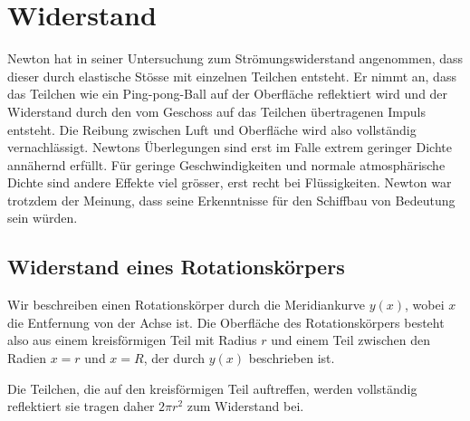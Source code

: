 %
%
%
%
\section{Widerstand\label{widerstand:section:teil0}}
Newton hat in seiner Untersuchung zum Strömungswiderstand angenommen,
dass dieser durch elastische Stösse mit einzelnen Teilchen entsteht.
Er nimmt an, dass das Teilchen wie ein Ping-pong-Ball auf der Oberfläche
reflektiert wird und der Widerstand durch den vom Geschoss auf das
Teilchen übertragenen Impuls entsteht.
Die Reibung zwischen Luft und Oberfläche wird also vollständig
vernachlässigt.
Newtons Überlegungen sind erst im Falle extrem geringer Dichte annähernd
erfüllt.
Für geringe Geschwindigkeiten und normale atmosphärische Dichte sind
andere Effekte viel grösser, erst recht bei Flüssigkeiten.
Newton war trotzdem der Meinung, dass seine Erkenntnisse für
den Schiffbau von Bedeutung sein würden.

%
%
\subsection{Widerstand eines Rotationskörpers}

Wir beschreiben einen Rotationskörper durch die Meridiankurve
$y(x)$, wobei $x$ die Entfernung von der Achse ist.
Die Oberfläche des Rotationskörpers besteht also aus einem kreisförmigen
Teil mit Radius $r$ und 
einem Teil zwischen den Radien $x=r$ und $x=R$, der durch $y(x)$
beschrieben ist.

Die Teilchen, die auf den kreisförmigen Teil auftreffen, werden vollständig
reflektiert sie tragen daher $2\pi r^2$ zum Widerstand bei.

